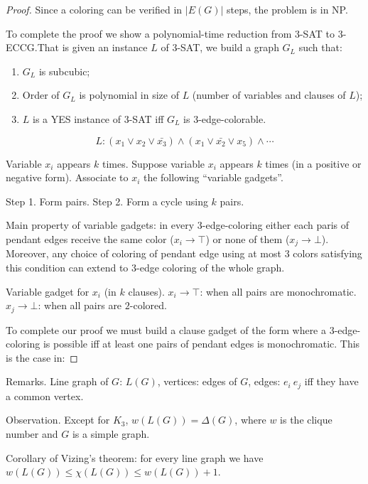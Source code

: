 \documentclass[12pt,a4paper]{article}
\begin{document}
\begin{proof}
  Since a coloring can be verified in \(|E(G)|\) steps, the problem is in NP.\@

  To complete the proof we show a polynomial-time reduction from \(3\)-SAT to
  \(3\)-ECCG.\@ That is given an instance \(L\) of \(3\)-SAT, we build a graph
  \(G_L\) such that:

  \begin{enumerate}
  \item \(G_L\) is subcubic;
  \item Order of \(G_L\) is polynomial in size of \(L\) (number of variables and
    clauses of \(L\));
  \item \(L\) is a YES instance of \(3\)-SAT iff \(G_L\) is
    \(3\)-edge-colorable.
  \end{enumerate}

  \[L: (x_1 \vee x_2 \vee \bar{x_3}) \wedge (x_1 \vee \bar{x_2} \vee x_5)
    \wedge \cdots\]

  Variable \(x_i\) appears \(k\) times. Suppose variable \(x_i\) appears \(k\)
  times (in a positive or negative form).  Associate to \(x_i\) the following
  \enquote{variable gadgets}.

  Step 1. Form pairs.
  Step 2. Form a cycle using \(k\) pairs.


  Main property of variable gadgets: in every \(3\)-edge-coloring either each
  paris of pendant edges receive the same color (\(x_i \to \top\)) or none of
  them (\(x_j \to \bot\)).  Moreover, any choice of coloring of pendant edge
  using at most \(3\) colors satisfying this condition can extend to \(3\)-edge
  coloring of the whole graph.

  Variable gadget for \(x_i\) (in \(k\) clauses).
  \(x_i \to \top\): when all pairs are monochromatic.
  \(x_j \to \bot\): when all pairs are \(2\)-colored.

  To complete our proof we must build a clause gadget of the form where a
  \(3\)-edge-coloring is possible iff at least one pairs of pendant edges is
  monochromatic. This is the case in:
\end{proof}

Remarks.  Line graph of \(G\): \(L(G)\), vertices: edges of \(G\), edges: \(e_i
~ e_j\) iff they have a common vertex.

Observation.  Except for \(K_3\), \(w(L(G)) = \Delta(G)\), where \(w\) is the
clique number and \(G\) is a simple graph.

Corollary of Vizing's theorem: for every line graph we have \(w(L(G)) \leq
\chi(L(G)) \leq w(L(G)) + 1\).
\end{document}

